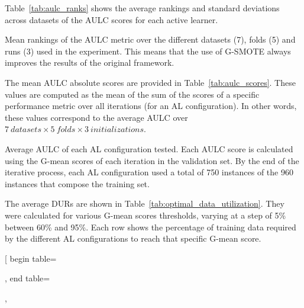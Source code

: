 \documentclass[remotesensing,article,submit,moreauthors,pdftex]{Definitions/mdpi}
\begin{document}
\begin{paracol}{2}
Table~\ref{tab:aulc_ranks} shows the average rankings and standard deviations
across datasets of the AULC scores for each active learner.

\begin{table}[H]
    \centering
    \caption{
        Mean rankings of the AULC metric over the different datasets (7),
        folds (5) and runs (3) used in the experiment. This means that the use
        of G-SMOTE always improves the results of the original framework.
    }\label{tab:aulc_ranks}
\end{table}

The mean AULC absolute scores are provided in Table~\ref{tab:aulc_scores}.
These values are computed as the mean of the sum of the scores of a specific
performance metric over all iterations (for an AL configuration). In other
words, these values correspond to the average AULC over $7\ datasets \times 5\
folds \times 3\ initializations$.

\begin{table}[htb]
    \centering
    \caption{\label{tab:aulc_scores}
        Average AULC of each AL configuration tested. Each AULC score is
        calculated using the G-mean scores of each iteration in the validation
        set. By the end of the iterative process, each AL configuration used a
        total of 750 instances of the 960 instances that compose the training
        set.
    }
\end{table}

The average DURs are shown in Table~\ref{tab:optimal_data_utilization}. They
were calculated for various G-mean scores thresholds, varying at a step of 5\%
between 60\% and 95\%. Each row shows the percentage of training data required
by the different AL configurations to reach that specific G-mean score.

\end{paracol}
\captionsetup{justification=centering}
\pgfplotstabletypeset[
	begin table=\begin{longtable},
	end table=\end{longtable},
\end{document}
